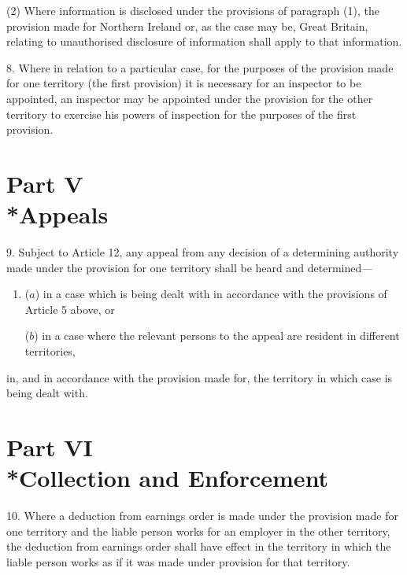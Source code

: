 \documentclass[12pt,a4paper]{article}
\begin{document}
(2) Where information is disclosed under the provisions of paragraph (1), the provision made for Northern Ireland or, as the case may be, Great Britain, relating to unauthorised disclosure of information shall apply to that information.


\medskip

8.  Where in relation to a particular case, for the purposes of the provision made for one territory (the first provision) it is necessary for an inspector to be appointed, an inspector may be appointed under the provision for the other territory to exercise his powers of inspection for the purposes of the first provision.

\section[Part V --- Appeals]{Part V\\*Appeals}

\renewcommand\parthead{--- Schedule 1 Part V}

9.  Subject to Article 12, any appeal from any decision of a determining authority made under the provision for one territory shall be heard and determined—
\begin{enumerate}\item[]
($a$) in a case which is being dealt with in accordance with the provisions of Article 5 above, or

($b$) in a case where the relevant persons to the appeal are resident in different territories,
\end{enumerate}
in, and in accordance with the provision made for, the territory in which case is being dealt with.

\section[Part VI --- Collection and Enforcement]{Part VI\\*Collection and Enforcement}

\renewcommand\parthead{--- Schedule 1 Part VI}

10.   Where a deduction from earnings order is made under the provision made for one territory and the liable person works for an employer in the other territory, the deduction from earnings order shall have effect in the territory in which the liable person works as if it was made under provision for that territory.
\end{document}
